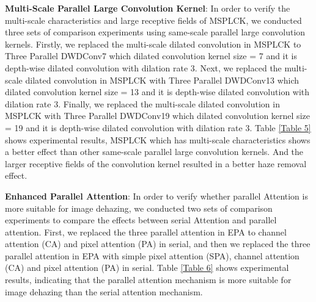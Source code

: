\documentclass[10pt,twocolumn,letterpaper]{article}
\begin{document}
\textbf{Multi-Scale Parallel Large Convolution Kernel}: In order to verify the multi-scale characteristics and large receptive fields of MSPLCK, we conducted three sets of comparison experiments using same-scale parallel large convolution kernels. Firstly, we replaced the multi-scale dilated convolution in MSPLCK to Three Parallel DWDConv7 which dilated convolution kernel size = 7 and it is  depth-wise dilated convolution with dilation rate 3. Next, we replaced the multi-scale dilated convolution in MSPLCK with Three Parallel DWDConv13 which dilated convolution kernel size = 13 and it is  depth-wise dilated convolution with dilation rate 3. Finally, we replaced the multi-scale dilated convolution in MSPLCK with Three Parallel DWDConv19 which dilated convolution kernel size = 19 and it is  depth-wise dilated convolution with dilation rate 3. Table \ref{Table 5} shows experimental results, MSPLCK which has multi-scale characteristics shows a better effect than other same-scale parallel large convolution kernels. And the larger receptive fields of the convolution kernel resulted in a better haze removal effect.

\textbf{Enhanced Parallel Attention}: In order to verify whether parallel Attention is more suitable for image dehazing, we conducted two sets of comparison experiments to compare the effects between serial Attention and parallel attention. First, we replaced the three parallel attention in EPA to channel attention (CA) and pixel attention (PA) in serial, and then we replaced the three parallel attention in EPA with simple pixel attention (SPA), channel attention (CA) and pixel attention (PA) in serial. Table \ref{Table 6} shows experimental results, indicating that the parallel attention mechanism is more suitable for image dehazing than the serial attention mechanism. 
\begin{table}
\renewcommand\arraystretch{1.5}
\centering
\caption{\centering Model Architecture Detailed.}
\label{Table 4}
\end{table}

\begin{table}[t b p]
\renewcommand\arraystretch{1.5}
\centering
\caption{\centering Multi-Scale Parallel Large Convolution kernel ablation study on the RESIDE-IN dataset.}
\label{Table 5}
\end{table}
\end{document}

